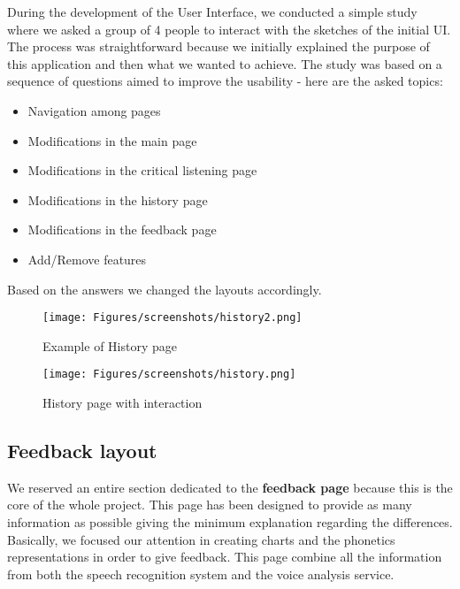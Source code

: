\noindent During the development of the User Interface, we conducted a simple study where we asked a group of 4 people to interact with the sketches of the initial UI. The process was straightforward because we initially explained the purpose of this application and then what we wanted to achieve. The study was based on a sequence of questions aimed to improve the usability - here are the asked topics:

\begin{itemize}
	\item Navigation among pages
	\item Modifications in the main page
	\item Modifications in the critical listening page
	\item Modifications in the history page
	\item Modifications in the feedback page
	\item Add/Remove features
\end{itemize}

\noindent Based on the answers we changed the layouts accordingly.

\begin{figure}[!ht]
	\centering
	\begin{minipage}{.5\textwidth}
		\centering
		\texttt{[image: Figures/screenshots/history2.png]}
		\caption{Example of History page}
		\label{fig:history2_page}
	\end{minipage}%
	\begin{minipage}{.5\textwidth}
		\centering
		\texttt{[image: Figures/screenshots/history.png]}
		\caption{History page with interaction}
		\label{fig:history_page}
	\end{minipage}
\end{figure}

\subsection{Feedback layout}
\label{ssec:feedback_layout}
We reserved an entire section dedicated to the \textbf{feedback page} because this is the core of the whole project. This page has been designed to provide as many information as possible giving the minimum explanation regarding the differences. Basically, we focused our attention in creating charts and the phonetics representations in order to give feedback. This page combine all the information from both the speech recognition system and the voice analysis service. \\

